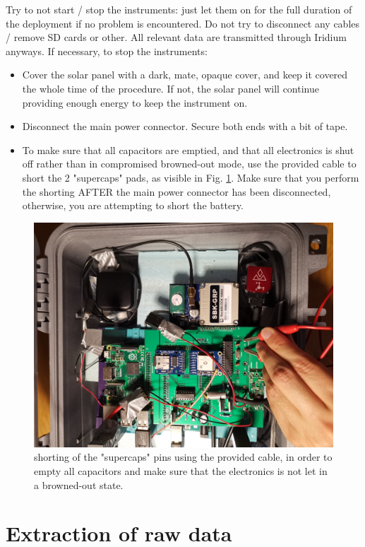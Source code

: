 \documentclass[pdftex,a4paper,12pt,twocolumn,fleqn,captions=tableheading]{scrartcl}
\begin{document}
Try to not start / stop the instruments: just let them on for the full duration of the deployment if no problem is encountered. Do not try to disconnect any cables / remove SD cards or other. All relevant data are transmitted through Iridium anyways. If necessary, to stop the instruments:

\begin{itemize}
  \item Cover the solar panel with a dark, mate, opaque cover, and keep it covered the whole time of the procedure. If not, the solar panel will continue providing enough energy to keep the instrument on.
  \item Disconnect the main power connector. Secure both ends with a bit of tape.
  \item To make sure that all capacitors are emptied, and that all electronics is shut off rather than in compromised browned-out mode, use the provided cable to short the 2 "supercaps" pads, as visible in Fig. \ref{shorting}. Make sure that you perform the shorting AFTER the main power connector has been disconnected, otherwise, you are attempting to short the battery.
\end{itemize}

  \begin{figure}
  \begin{center}
  \includegraphics[width=.8\textwidth]{Figures/shorting}
  \caption{\label{shorting} shorting of the "supercaps" pins using the provided cable, in order to empty all capacitors and make sure that the electronics is not let in a browned-out state.}
  \end{center}
  \end{figure}

\section{Extraction of raw data}
\end{document}
